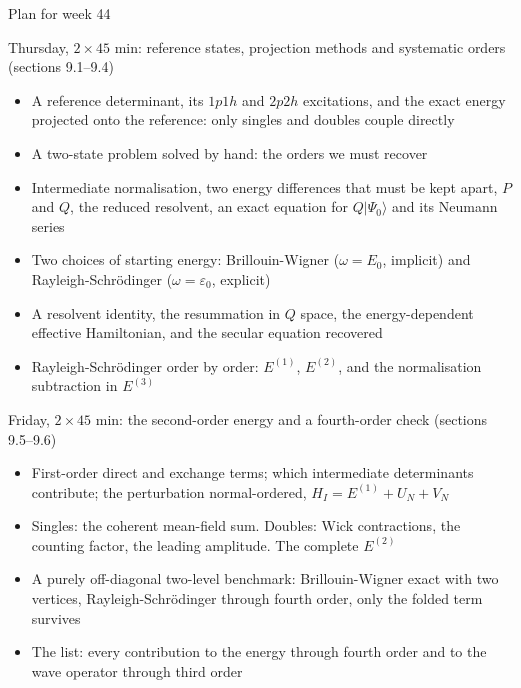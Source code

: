 \documentclass[aspectratio=169,10pt]{beamer}
\newcommand{\ket}[1]{\vert #1\rangle}
\newcommand{\Psizero}{\Psi_0}
\begin{document}
\begin{frame}[shrink=5]{Plan for week 44}
  \begin{block}{Thursday, $2\times45$ min: reference states, projection methods and systematic orders (sections 9.1--9.4)}
    \begin{itemize}
      \item A reference determinant, its $1p1h$ and $2p2h$ excitations, and the exact energy projected onto the reference: only singles and doubles couple directly
      \item A two-state problem solved by hand: the orders we must recover
      \item Intermediate normalisation, two energy differences that must be kept apart, $P$ and $Q$, the reduced resolvent, an exact equation for $Q\ket{\Psizero}$ and its Neumann series
      \item Two choices of starting energy: Brillouin-Wigner ($\omega=E_0$, implicit) and Rayleigh-Schr\"odinger ($\omega=\varepsilon_0$, explicit)
      \item A resolvent identity, the resummation in $Q$ space, the energy-dependent effective Hamiltonian, and the secular equation recovered
      \item Rayleigh-Schr\"odinger order by order: $E^{(1)}$, $E^{(2)}$, and the normalisation subtraction in $E^{(3)}$
    \end{itemize}
  \end{block}
  \begin{block}{Friday, $2\times45$ min: the second-order energy and a fourth-order check (sections 9.5--9.6)}
    \begin{itemize}
      \item First-order direct and exchange terms; which intermediate determinants contribute; the perturbation normal-ordered, $H_I=E^{(1)}+U_N+V_N$
      \item Singles: the coherent mean-field sum. Doubles: Wick contractions, the counting factor, the leading amplitude. The complete $E^{(2)}$
      \item A purely off-diagonal two-level benchmark: Brillouin-Wigner exact with two vertices, Rayleigh-Schr\"odinger through fourth order, only the folded term survives
      \item \alert{The list}: every contribution to the energy through fourth order and to the wave operator through third order
    \end{itemize}
  \end{block}
\end{frame}
\end{document}
